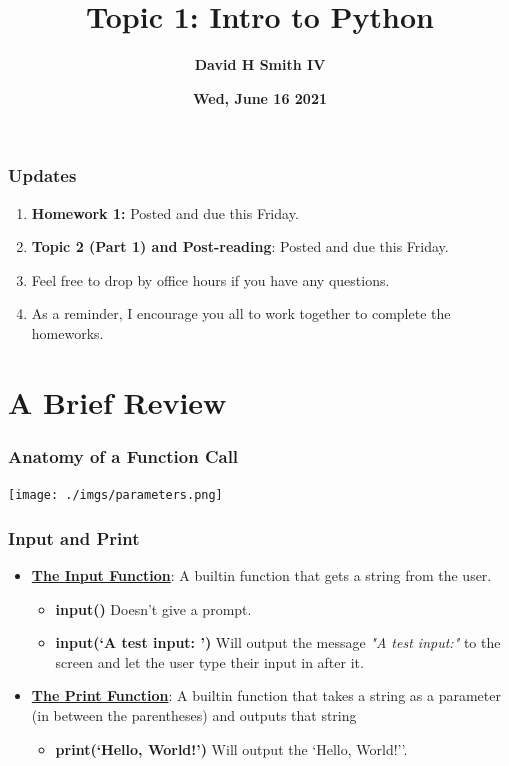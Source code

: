 \documentclass{beamer}
\title{\textbf{Topic 1: Intro to Python}}
\author{\textbf{David H Smith IV}}
\institute[\textbf{UIUC}]{\textbf{University of Illinois Urbana-Champaign}}
\date{\textbf{Wed, June 16 2021}}
\begin{document}
\frame{\titlepage}

\begin{frame}
  \frametitle{Updates}
  \begin{enumerate}
    \item \textbf{Homework 1:} Posted and due this Friday.
    \item \textbf{Topic 2 (Part 1) and Post-reading}: Posted and due this Friday.
    \item Feel free to drop by office hours if you have any questions.
    \item As a reminder, I encourage you all to work together to complete the homeworks.
  \end{enumerate}
\end{frame}

\section{A Brief Review}

\begin{frame}
  \frametitle{Anatomy of a Function Call}
  \centering
  \texttt{[image: ./imgs/parameters.png]}
\end{frame}


\begin{frame}
  \frametitle{Input and Print}
  \begin{itemize}
    \item \underline{\textbf{The Input Function}}: A builtin function that gets a string from the user.
      \pause
      \begin{itemize}
        \item \textbf{input()} \textrightarrow Doesn't give a prompt.
          \pause
        \item \textbf{input(`A test input: ')} \textrightarrow Will output the message \textit{"A test input:"} to the screen and let the user type their input in after it.
          \pause
      \end{itemize}
    \item \underline{\textbf{The Print Function}}: A builtin function that takes a string as a parameter (in between the parentheses) and outputs that string
      \pause
      \begin{itemize}
        \item \textbf{print(`Hello, World!')} \textrightarrow Will output the `Hello, World!''. 
      \end{itemize}
  \end{itemize}
\end{frame}
\end{document}
